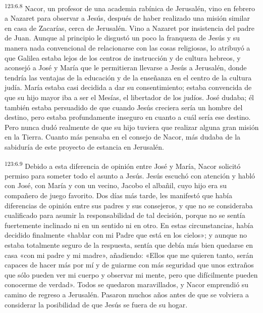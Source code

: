 \par
\textsuperscript{123:6.8} Nacor, un profesor de una academia rabínica de Jerusalén, vino en febrero a Nazaret para observar a Jesús, después de haber realizado una misión similar en casa de Zacarías, cerca de Jerusalén. Vino a Nazaret por insistencia del padre de Juan. Aunque al principio le disgustó un poco la franqueza de Jesús y su manera nada convencional de relacionarse con las cosas religiosas, lo atribuyó a que Galilea estaba lejos de los centros de instrucción y de cultura hebreos, y aconsejó a José y María que le permitieran llevarse a Jesús a Jerusalén, donde tendría las ventajas de la educación y de la enseñanza en el centro de la cultura judía. María estaba casi decidida a dar su consentimiento; estaba convencida de que su hijo mayor iba a ser el Mesías, el libertador de los judíos. José dudaba; él también estaba persuadido de que cuando Jesús creciera sería un hombre del destino, pero estaba profundamente inseguro en cuanto a cuál sería ese destino. Pero nunca dudó realmente de que su hijo tuviera que realizar alguna gran misión en la Tierra. Cuanto más pensaba en el consejo de Nacor, más dudaba de la sabiduría de este proyecto de estancia en Jerusalén.

\par
\textsuperscript{123:6.9} Debido a esta diferencia de opinión entre José y María, Nacor solicitó permiso para someter todo el asunto a Jesús. Jesús escuchó con atención y habló con José, con María y con un vecino, Jacobo el albañil, cuyo hijo era su compañero de juego favorito. Dos días más tarde, les manifestó que había diferencias de opinión entre sus padres y sus consejeros, y que no se consideraba cualificado para asumir la responsabilidad de tal decisión, porque no se sentía fuertemente inclinado ni en un sentido ni en otro. En estas circunstancias, había decidido finalmente «hablar con mi Padre que está en los cielos»; y aunque no estaba totalmente seguro de la respuesta, sentía que debía más bien quedarse en casa «con mi padre y mi madre», añadiendo: «Ellos que me quieren tanto, serán capaces de hacer más por mí y de guiarme con más seguridad que unos extraños que sólo pueden ver mi cuerpo y observar mi mente, pero que difícilmente pueden conocerme de verdad». Todos se quedaron maravillados, y Nacor emprendió su camino de regreso a Jerusalén. Pasaron muchos años antes de que se volviera a considerar la posibilidad de que Jesús se fuera de su hogar.